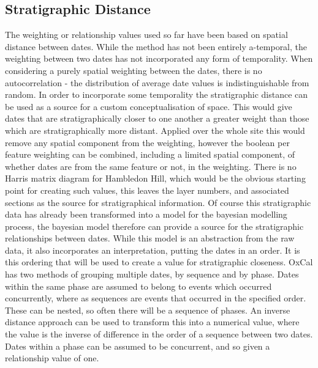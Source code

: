 \subsection{Stratigraphic Distance}
The weighting or relationship values used so far have been based on spatial distance between dates. While the method has not been entirely a-temporal, the weighting between two dates has not incorporated any form of temporality. When considering a purely spatial weighting between the dates, there is no autocorrelation - the distribution of average date values is indistinguishable from random. In order to incorporate some temporality the stratigraphic distance can be used as a source for a custom conceptualisation of space. This would give dates that are stratigraphically closer to one another a greater weight than those which are stratigraphically more distant. Applied over the whole site this would remove any spatial component from the weighting, however the boolean per feature weighting can be combined, including a limited spatial component, of whether dates are from the same feature or not, in the weighting. There is no Harris matrix diagram for Hambledon Hill, which would be the obvious starting point for creating such values, this leaves the layer numbers, and associated sections as the source for stratigraphical information. Of course this stratigraphic data has already been transformed into a model for the bayesian modelling process, the bayesian model therefore can provide a source for the stratigraphic relationships between dates. While this model is an abstraction from the raw data, it also incorporates an interpretation, putting the dates in an order. It is this ordering that will be used to create a value for stratigraphic closeness. OxCal has two methods of grouping multiple dates, by sequence and by phase. Dates within the same phase are assumed to belong to events which occurred concurrently, where as sequences are events that occurred in the specified order. These can be nested, so often there will be a sequence of phases. An inverse distance approach can be used to transform this into a numerical value, where the value is the inverse of difference in the order of a sequence between two dates. Dates within a phase can be assumed to be concurrent, and so given a relationship value of one.

